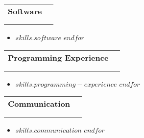 \documentclass[letterpaper,11pt]{article}
\makeatletter
\newcommand{\ressubheading}[4]{\vspace{-7pt}
\begin{tabular*}{7in}{l@{\extracolsep{\fill}}r}
	\textbf{#1} & #2 \\
	\ifstrempty{#3}{
	}{
		\textit{#3} & #4 \\
	}
\end{tabular*}\vspace{-6pt}}
\makeatother
\begin{document}
\begin{multicols*}{3}
\ressubheading{Software}{}{}{}
	\begin{itemize}
		$for(skills.software)$
			\item{$skills.software$}\vspace{-7pt}
		$endfor$
	\end{itemize}
\vfill\null
\columnbreak
%
\ressubheading{Programming Experience}{}{}{}
	\begin{itemize}
		$for(skills.programming-experience)$
			\item{$skills.programming-experience$}\vspace{-7pt}
		$endfor$
	\end{itemize}
\vfill\null
\columnbreak
%
\ressubheading{Communication}{}{}{}
	\begin{itemize}
		$for(skills.communication)$
			\item{$skills.communication$}\vspace{-7pt}
		$endfor$
	\end{itemize}
\end{multicols*}
% 
\end{document}
